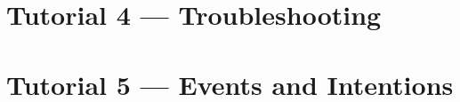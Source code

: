 \section{Tutorial 4 --- Troubleshooting}

{
  \let\section\subsection
  \let\subsection\subsubsection
  \let\subsubsection\paragraph
  
  
  }

\section{Tutorial 5 --- Events and Intentions}

{
  \let\section\subsection
  \let\subsection\subsubsection
  \let\subsubsection\paragraph
  
  
  }

